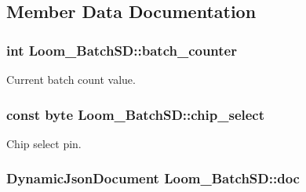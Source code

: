 \subsection{Member Data Documentation}
\subsubsection[{\texorpdfstring{batch\+\_\+counter}{batch_counter}}]{\setlength{\rightskip}{0pt plus 5cm}int Loom\+\_\+\+Batch\+S\+D\+::batch\+\_\+counter\hspace{0.3cm}{\ttfamily [protected]}}\hypertarget{class_loom___batch_s_d_aac325ca5667cd8d81409072f890be678}{}\label{class_loom___batch_s_d_aac325ca5667cd8d81409072f890be678}


Current batch count value. 

\subsubsection[{\texorpdfstring{chip\+\_\+select}{chip_select}}]{\setlength{\rightskip}{0pt plus 5cm}const byte Loom\+\_\+\+Batch\+S\+D\+::chip\+\_\+select\hspace{0.3cm}{\ttfamily [protected]}}\hypertarget{class_loom___batch_s_d_abe9e47bc3e511e89056b2da32f580eed}{}\label{class_loom___batch_s_d_abe9e47bc3e511e89056b2da32f580eed}


Chip select pin. 

\subsubsection[{\texorpdfstring{doc}{doc}}]{\setlength{\rightskip}{0pt plus 5cm}Dynamic\+Json\+Document Loom\+\_\+\+Batch\+S\+D\+::doc\hspace{0.3cm}{\ttfamily [protected]}}\hypertarget{class_loom___batch_s_d_a06ca96fe43ddf77a2f20ca2877be7e85}{}\label{class_loom___batch_s_d_a06ca96fe43ddf77a2f20ca2877be7e85}
